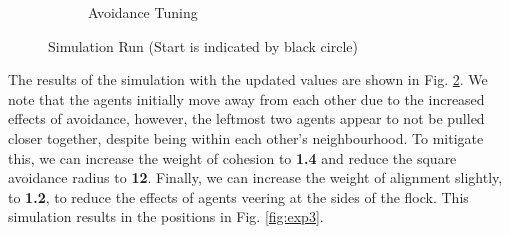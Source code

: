 \documentclass[12pt]{article}
\begin{document}
\begin{figure}[ht]
\begin{subfigure}{.4\textwidth}
    \caption{Avoidance Tuning}
    \label{fig:exp2}
\end{subfigure}
\caption{Simulation Run (Start is indicated by black circle)} 
\end{figure}

The results of the simulation with the updated values are shown in Fig. \ref{fig:exp2}. We note that the agents initially move away from each other due to the increased effects of avoidance, however, the leftmost two agents appear to not be pulled closer together, despite being within each other's neighbourhood. To mitigate this, we can increase the weight of cohesion to \textbf{1.4} and reduce the square avoidance radius to \textbf{12}. Finally, we can increase the weight of alignment slightly, to \textbf{1.2}, to reduce the effects of agents veering at the sides of the flock. This simulation results in the positions in Fig. \ref{fig:exp3}.
\end{document}
